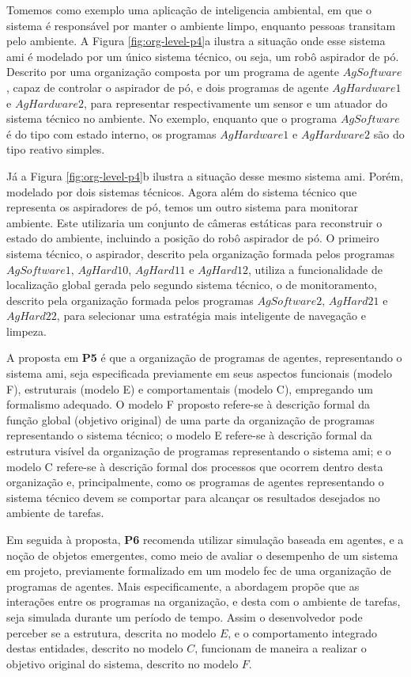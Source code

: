     Tomemos como exemplo uma aplicação de inteligencia ambiental, em que o sistema é responsável por manter o ambiente limpo, enquanto pessoas transitam pelo ambiente. A Figura \ref{fig:org-level-p4}a ilustra a situação onde esse sistema \acrshort{ami} é modelado por um único sistema técnico, ou seja, um robô aspirador de pó. Descrito por uma organização composta por um programa de agente $AgSoftware$, capaz de controlar o aspirador de pó, e dois programas de agente $AgHardware1$ e $AgHardware2$, para representar respectivamente um sensor e um atuador do sistema técnico no ambiente. No exemplo, enquanto que o programa $AgSoftware$ é do tipo com estado interno, os programas $AgHardware1$ e $AgHardware2$ são do tipo reativo simples.
    
    Já a Figura \ref{fig:org-level-p4}b ilustra a situação desse mesmo sistema \acrshort{ami}. Porém, modelado por dois sistemas técnicos. Agora além do sistema técnico que representa os aspiradores de pó, temos um outro sistema para monitorar ambiente. Este utilizaria um conjunto de câmeras estáticas para reconstruir o estado do ambiente, incluindo a posição do robô aspirador de pó. O primeiro sistema técnico, o aspirador, descrito pela organização formada pelos programas $AgSoftware1$, $AgHard10$, $AgHard11$ e $AgHard12$, utiliza a funcionalidade de localização global gerada pelo segundo sistema técnico, o de monitoramento, descrito pela organização formada pelos programas $AgSoftware2$, $AgHard21$ e $AgHard22$, para selecionar uma estratégia mais inteligente de navegação e limpeza.
    
    A proposta em \textbf{P5} é que a organização de programas de agentes, representando o sistema \acrshort{ami}, seja especificada previamente em seus aspectos funcionais (modelo F), estruturais (modelo E) e comportamentais (modelo C), empregando um formalismo adequado. O modelo F proposto refere-se à descrição formal da função global (objetivo original) de uma parte da organização de programas representando o sistema técnico; o modelo E refere-se à descrição formal da estrutura visível da organização de programas representando o sistema \acrshort{ami}; e o modelo C refere-se à descrição formal dos processos que ocorrem dentro desta organização e, principalmente, como os programas de agentes representando o sistema técnico devem se comportar para alcançar os resultados desejados no ambiente de tarefas.
    
    Em seguida à proposta, \textbf{P6} recomenda utilizar simulação baseada em agentes, e a noção de objetos emergentes, como meio de avaliar o desempenho de um sistema em projeto, previamente formalizado em um modelo \acrshort{fec} de uma organização de programas de agentes. Mais especificamente, a abordagem propõe que as interações entre os programas na organização, e desta com o ambiente de tarefas, seja simulada durante um período de tempo. Assim o desenvolvedor pode perceber se a estrutura, descrita no modelo $E$, e o comportamento integrado destas entidades, descrito no modelo $C$, funcionam de maneira a realizar o objetivo original do sistema, descrito no modelo $F$.
    
